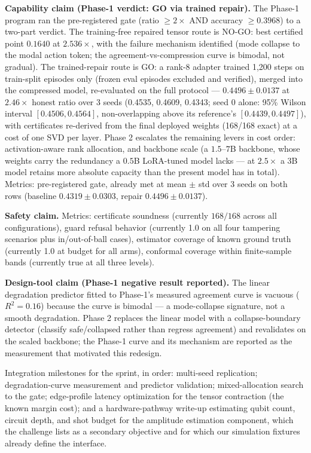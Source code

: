 \documentclass[10pt]{article}
\begin{document}
\textbf{Capability claim (Phase-1 verdict: GO via trained repair).}
The Phase-1 program ran the pre-registered gate (ratio $\ge 2\times$ AND
accuracy $\ge 0.3968$) to a two-part verdict. The training-free repaired
tensor route is NO-GO: best certified point $0.1640$ at $2.536\times$, with
the failure mechanism identified (mode collapse to the modal action token;
the agreement-vs-compression curve is bimodal, not gradual). The
trained-repair route is GO: a rank-8 adapter trained 1{,}200 steps on
train-split episodes only (frozen eval episodes excluded and verified),
merged into the compressed model, re-evaluated on the full protocol ---
$0.4496 \pm 0.0137$ at $2.46\times$ honest ratio over 3 seeds (0.4535,
0.4609, 0.4343; seed 0 alone: 95\% Wilson interval $[0.4506, 0.4564]$,
non-overlapping above its reference's $[0.4439, 0.4497]$), with
certificates re-derived from the final deployed weights (168/168 exact) at
a cost of one SVD per layer. Phase 2 escalates the remaining levers in cost
order: activation-aware rank allocation, and backbone scale (a $1.5$--$7$B
backbone, whose weights carry the redundancy a $0.5$B LoRA-tuned model
lacks --- at $2.5\times$ a $3$B model retains more absolute capacity than
the present model has in total). Metrics: pre-registered gate, already met
at mean $\pm$ std over 3 seeds on both rows (baseline $0.4319 \pm 0.0303$,
repair $0.4496 \pm 0.0137$).

\textbf{Safety claim.} Metrics: certificate soundness (currently $168/168$
across all configurations), guard refusal behavior (currently 1.0 on all four
tampering scenarios plus in/out-of-ball cases), estimator coverage of known
ground truth (currently 1.0 at budget for all arms), conformal coverage
within finite-sample bands (currently true at all three levels).

\textbf{Design-tool claim (Phase-1 negative result reported).} The linear
degradation predictor fitted to Phase-1's measured agreement curve is
vacuous ($R^{2} = 0.16$) because the curve is bimodal --- a mode-collapse
signature, not a smooth degradation. Phase 2 replaces the linear model with
a collapse-boundary detector (classify safe/collapsed rather than regress
agreement) and revalidates on the scaled backbone; the Phase-1 curve and
its mechanism are reported as the measurement that motivated this redesign.

Integration milestones for the sprint, in order: multi-seed replication;
degradation-curve measurement and predictor validation; mixed-allocation
search to the gate; edge-profile latency optimization for the tensor
contraction (the known margin cost); and a hardware-pathway write-up
estimating qubit count, circuit depth, and shot budget for the amplitude
estimation component, which the challenge lists as a secondary objective and
for which our simulation fixtures already define the interface.
\end{document}
